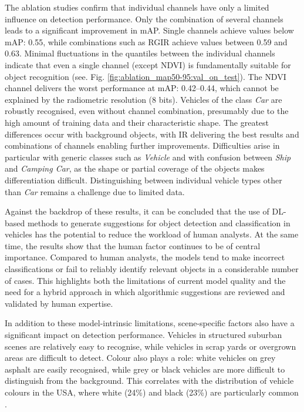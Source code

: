 The ablation studies confirm that individual channels have only a limited influence on detection performance. Only the combination of several channels leads to a significant improvement in \acrshort{mAP}. Single channels achieve values below \acrshort{mAP}: 0.55, while combinations such as RGIR achieve values between 0.59 and 0.63. Minimal fluctuations in the quantiles between the individual channels indicate that even a single channel (except \acrshort{NDVI}) is fundamentally suitable for object recognition (see. Fig. \ref{fig:ablation_map50-95:val_on_test}). The \acrshort{NDVI} channel delivers the worst performance at \acrshort{mAP}: 0.42–0.44, which cannot be explained by the radiometric resolution (8 bits). Vehicles of the class \textit{Car} are robustly recognised, even without channel combination, presumably due to the high amount of training data and their characteristic shape. The greatest differences occur with background objects, with IR delivering the best results and combinations of channels enabling further improvements. Difficulties arise in particular with generic classes such as \textit{Vehicle} and with confusion between \textit{Ship} and \textit{Camping Car}, as the shape or partial coverage of the objects makes differentiation difficult. Distinguishing between individual vehicle types other than \textit{Car} remains a challenge due to limited data.

Against the backdrop of these results, it can be concluded that the use of \acrshort{DL}-based methods to generate suggestions for object detection and classification in vehicles has the potential to reduce the workload of human analysts. At the same time, the results show that the human factor continues to be of central importance. Compared to human analysts, the models tend to make incorrect classifications or fail to reliably identify relevant objects in a considerable number of cases. This highlights both the limitations of current model quality and the need for a hybrid approach in which algorithmic suggestions are reviewed and validated by human expertise.

In addition to these model-intrinsic limitations, scene-specific factors also have a significant impact on detection performance. Vehicles in structured suburban scenes are relatively easy to recognise, while vehicles in scrap yards or overgrown areas are difficult to detect. Colour also plays a role: white vehicles on grey asphalt are easily recognised, while grey or black vehicles are more difficult to distinguish from the background. This correlates with the distribution of vehicle colours in the USA, where white (24\%) and black (23\%) are particularly common \cite{abc_utah}.


